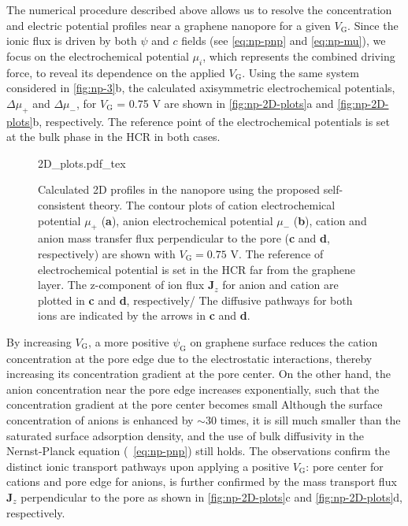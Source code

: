 The numerical procedure described above allows us to resolve the
concentration and electric potential profiles near a graphene
nanopore for a given $V_{\mathrm{G}}$.
%
Since the ionic flux is driven
by both $\psi$ and $c$ fields (see  \autoref{eq:np-pnp} and \autoref{eq:np-mu}),
we focus on the electrochemical potential $\mu_{i}$, which represents
the combined driving force, to reveal its dependence on the applied
$V_{\mathrm{G}}$.
%
Using the same system considered in 
\autoref{fig:np-3}b, the calculated axisymmetric electrochemical potentials,
$\Delta \mu_{+}$ and $\Delta \mu_{-}$, for
$V_{\mathrm{G}}$ = 0.75 V are shown in  \autoref{fig:np-2D-plots}a and
\autoref{fig:np-2D-plots}b, respectively. %
The reference point of the electrochemical
potentials is set at the bulk phase in the HCR in both cases.
%
\begin{figure}[!htbp]
  \centering
  {2D_plots.pdf_tex}
  \caption{Calculated 2D profiles in the nanopore using the proposed
    self-consistent theory. The contour plots of cation
    electrochemical potential $\mu_{\mathrm{+}}$ (\textbf{a}), anion
    electrochemical potential $\mu_{\mathrm{-}}$ (\textbf{b}), cation
    and anion mass transfer flux perpendicular to the pore (\textbf{c}
    and \textbf{d}, respectively) are shown with
    $V_{\mathrm{G}} = 0.75$ V.  The reference of electrochemical
    potential is set in the HCR far from the graphene layer. The
    z-component of ion flux $\symbf{J}_{z}$ for anion and cation are
    plotted in \textbf{c} and \textbf{d}, respectively/%
    The diffusive pathways for both ions are indicated by the arrows
    in \textbf{c} and \textbf{d}.%
  }
  \label{fig:np-2D-plots}
\end{figure}
%
By increasing $V_{\mathrm{G}}$, a more positive $\psi_{\mathrm{G}}$ on
graphene surface reduces the cation concentration at the pore edge due
to the electrostatic interactions, thereby increasing its
concentration gradient at the pore center. On the other hand, the
anion concentration near the pore edge increases exponentially, such
that the concentration gradient at the pore center becomes small
%
Although the surface concentration of anions is enhanced by $\sim{}$30
times, it is sill much smaller than the saturated surface adsorption
density, and the use of bulk diffusivity in the Nernst-Planck equation
(~\autoref{eq:np-pnp}) still holds.
%
%
The observations confirm the distinct ionic transport pathways upon
applying a positive $V_{\mathrm{G}}$: pore center for cations and pore
edge for anions, is further confirmed by the mass transport flux
$\symbf{J}_{z}$ perpendicular to the pore as shown in
\autoref{fig:np-2D-plots}c and \autoref{fig:np-2D-plots}d, respectively.

